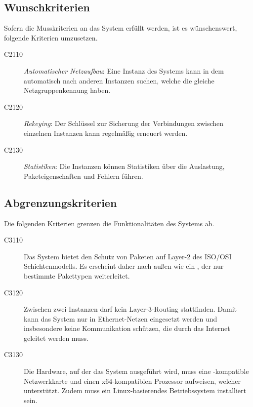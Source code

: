 \subsection{Wunschkriterien}
Sofern die Musskriterien an das System erfüllt werden, ist es wünschenswert, folgende Kriterien umzusetzen.
	\begin{description}
	  \item[C2110] \textit{Automatischer Netzaufbau}: Eine Instanz des Systems kann in dem  automatisch nach anderen Instanzen suchen, welche die gleiche Netzgruppenkennung haben. 
	  
	  \item[C2120] \textit{Rekeying}: Der Schlüssel zur Sicherung der Verbindungen zwischen einzelnen Instanzen kann regelmäßig erneuert werden. 
	  
	  \item[C2130] \textit{Statistiken}: Die Instanzen können Statistiken über die Auslastung, Paketeigenschaften und Fehlern führen.
	\end{description}
 

\subsection{Abgrenzungskriterien}
Die folgenden Kriterien grenzen die Funktionalitäten des Systems ab.
	\begin{description}
	  \item[C3110] Das System bietet den Schutz von Paketen auf Layer-2 des ISO/OSI Schichtenmodells.
	  Es erscheint daher nach außen wie ein , der nur bestimmte Pakettypen weiterleitet. 
	  
	  \item[C3120] Zwischen zwei Instanzen darf kein Layer-3-Routing stattfinden.
	  Damit kann das System nur in Ethernet-Netzen eingesetzt werden und insbesondere keine Kommunikation schützen, die durch das Internet geleitet werden muss.
	   
	  \item[C3130] Die Hardware, auf der das System ausgeführt wird, muss eine -kompatible Netzwerkkarte und einen x64-kompatiblen Prozessor aufweisen, welcher  unterstützt.
	  Zudem muss ein Linux-basierendes Betriebssystem installiert sein.
	\end{description}

